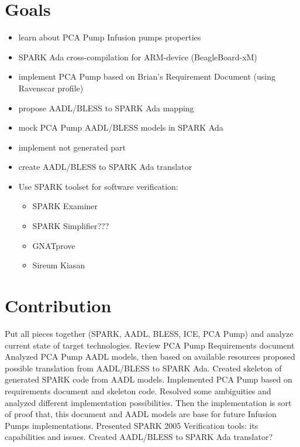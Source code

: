 \section{Goals}
\label{introduction:goals}
\begin{itemize}
	\item learn about PCA Pump Infusion pumps properties
	\item SPARK Ada cross-compilation for ARM-device (BeagleBoard-xM)
	\item implement PCA Pump based on Brian's Requirement Document (using Ravenscar profile)
	\item propose AADL/BLESS to SPARK Ada mapping
	\item mock PCA Pump AADL/BLESS models in SPARK Ada
	\item implement not generated part
	\item create AADL/BLESS to SPARK Ada translator
	\item Use SPARK toolset for software verification:
		\begin{itemize}
			\item SPARK Examiner
			\item SPARK Simplifier??? %
			\item GNATprove
			\item Sireum Kiasan
		\end{itemize}
\end{itemize}




\section{Contribution}
\label{introduction:contribution}
Put all pieces together (SPARK, AADL, BLESS, ICE, PCA Pump) and analyze current state of target technologies.
Review PCA Pump Requirements document
Analyzed PCA Pump AADL models, then based on available resources proposed possible translation from AADL/BLESS to SPARK Ada.
Created skeleton of generated SPARK code from AADL models.
Implemented PCA Pump based on requirements document and skeleton code. Resolved some ambiguities and analyzed different implementation possibilities. Then the implementation is sort of proof that, this document and AADL models are base for future Infusion Pumps implementations.
Presented SPARK 2005 Verification tools: its capabilities and issues.
Created AADL/BLESS to SPARK Ada translator?



